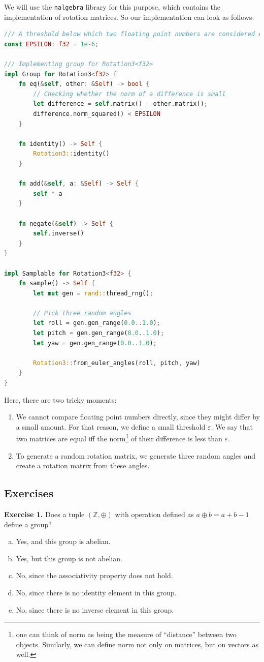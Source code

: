 \documentclass[../lecture-notes.tex]{subfiles}
\begin{document}
We will use the \texttt{nalgebra} library for this purpose, which contains the implementation of rotation matrices. So our implementation can look as follows:
\begin{lstlisting}[language=Rust]
/// A threshold below which two floating point numbers are considered equal.
const EPSILON: f32 = 1e-6;

/// Implementing group for Rotation3<f32>
impl Group for Rotation3<f32> {
    fn eq(&self, other: &Self) -> bool {
        // Checking whether the norm of a difference is small
        let difference = self.matrix() - other.matrix();
        difference.norm_squared() < EPSILON
    }

    fn identity() -> Self {
        Rotation3::identity()
    }

    fn add(&self, a: &Self) -> Self {
        self * a
    }

    fn negate(&self) -> Self {
        self.inverse()
    }
}

impl Samplable for Rotation3<f32> {
    fn sample() -> Self {
        let mut gen = rand::thread_rng();

        // Pick three random angles
        let roll = gen.gen_range(0.0..1.0);
        let pitch = gen.gen_range(0.0..1.0);
        let yaw = gen.gen_range(0.0..1.0);

        Rotation3::from_euler_angles(roll, pitch, yaw)
    }
}
\end{lstlisting}

Here, there are two tricky moments:
\begin{enumerate}
    \item We cannot compare floating point numbers directly, since they might differ by a small amount. For that reason, we define a small threshold $\varepsilon$. We say that two matrices are equal iff the norm\footnote{one can think of norm as being the measure of ``distance'' between two objects. Similarly, we can define norm not only on matrices, but on vectors as well.} of their difference is less than $\varepsilon$.
    \item To generate a random rotation matrix, we generate three random angles and create a rotation matrix from these angles.
\end{enumerate}

\subsection{Exercises}


\textbf{Exercise 1.} Does a tuple $(\mathbb{Z},\oplus)$ with operation defined as $a \oplus b = a + b - 1$ define a group?
\begin{enumerate}[a)]
    \item Yes, and this group is abelian.
    \item Yes, but this group is not abelian.
    \item No, since the associativity property does not hold.
    \item No, since there is no identity element in this group.
    \item No, since there is no inverse element in this group.
\end{enumerate}
\end{document}
